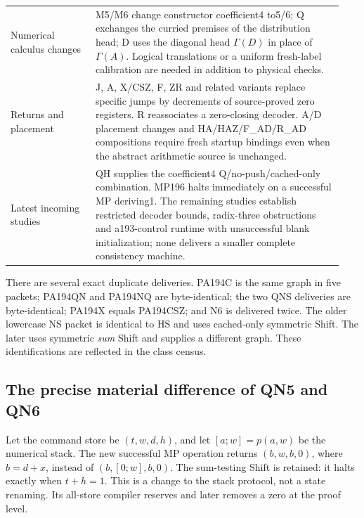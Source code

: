 \begin{longtable}{@{}p{0.24\linewidth}p{0.70\linewidth}@{}}
Numerical calculus changes &
M5/M6 change constructor coefficient4 to5/6; Q exchanges the curried premises
of the distribution head; D uses the diagonal head $\Gamma(D)$ in place of
$\Gamma(A)$. Logical translations or a uniform fresh-label calibration are
needed in addition to physical checks.\\[3pt]
Returns and placement &
J, A, X/CSZ, F, ZR and related variants replace specific jumps by decrements of
source-proved zero registers. R reassociates a zero-closing decoder. A/D
placement changes and HA/HAZ/F\_AD/R\_AD compositions require fresh startup
bindings even when the abstract arithmetic source is unchanged.\\[3pt]
Latest incoming studies &
QH supplies the coefficient4 Q/no-push/cached-only combination. MP196 halts
immediately on a successful MP deriving1. The remaining studies establish
restricted decoder bounds, radix-three obstructions and a193-control runtime
with unsuccessful blank initialization; none delivers a smaller complete
consistency machine.\\
\bottomrule
\end{longtable}

There are several exact duplicate deliveries. PA194C is the same graph in five
packets; PA194QN and PA194NQ are byte-identical; the two QNS deliveries are
byte-identical; PA194X equals PA194CSZ; and N6 is delivered twice. The older
lowercase NS packet is identical to HS and uses cached-only symmetric Shift.
The later  uses symmetric \emph{sum} Shift and supplies
a different graph. These identifications are reflected in the class census.

\subsection{The precise material difference of QN5 and QN6}

Let the command store be $(t,w,d,h)$, and let $[a;w]=p(a,w)$ be the numerical
stack. The new successful MP operation returns $(b,w,b,0)$, where $b=d+x$,
instead of $(b,[0;w],b,0)$. The sum-testing Shift is retained: it halts exactly
when $t+h=1$. This is a change to the stack protocol, not a state renaming.
Its all-store compiler reserves and later removes a zero at the proof level.


